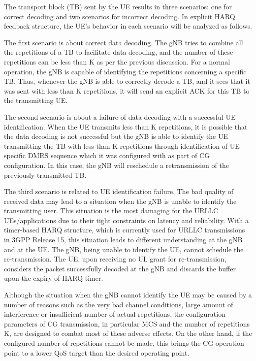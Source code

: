 \documentclass[conference]{IEEEtran}
\begin{document}
The transport block (TB) sent by the UE results in three scenarios: one for correct decoding and two scenarios for incorrect decoding. In explicit HARQ feedback structure, the UE's behavior in each scenario will be analyzed as follows. 

The first scenario is about correct data decoding. The gNB tries to combine all the repetitions of a TB to facilitate data decoding, and the number of these repetitions can be less than K as per the previous discussion. For a normal operation, the gNB is capable of identifying the repetitions concerning a specific TB. Thus, whenever the gNB is able to correctly decode a TB, and it sees that it was sent with less than K repetitions, it will send an explicit ACK for this TB to the transmitting UE.

The second scenario is about a failure of data decoding with a successful UE identification. When the UE transmits less than K repetitions, it is possible that the data decoding is not successful but the gNB is able to identify the UE transmitting the TB with less than K repetitions through identification of UE specific DMRS sequence which it was configured with as part of CG configuration. In this case, the gNB will reschedule a retransmission of the previously transmitted TB. 

The third scenario is related to UE identification failure. The bad quality of received data may lead to a situation when the gNB is unable to identify the transmitting user. This situation is the most damaging for the URLLC UEs/applications due to their tight constraints on latency and reliability. With a timer-based HARQ structure, which is currently used for URLLC transmissions in 3GPP Release 15, this situation leads to different understanding at the gNB and at the UE. The gNB, being unable to identify the UE, cannot schedule the re-transmission. The UE, upon receiving no UL grant for re-transmission, considers the packet successfully decoded at the gNB and discards the buffer upon the expiry of HARQ timer.

Although the situation when the gNB cannot identify the UE may be caused by a number of reasons such as the very bad channel conditions, large amount of interference or insufficient number of actual repetitions, the configuration parameters of CG transmission, in particular MCS and the number of repetitions K, are designed to combat most of these adverse effects. On the other hand, if the configured number of repetitions cannot be made, this brings the CG operation point to a lower QoS target than the desired operating point.
\end{document}
